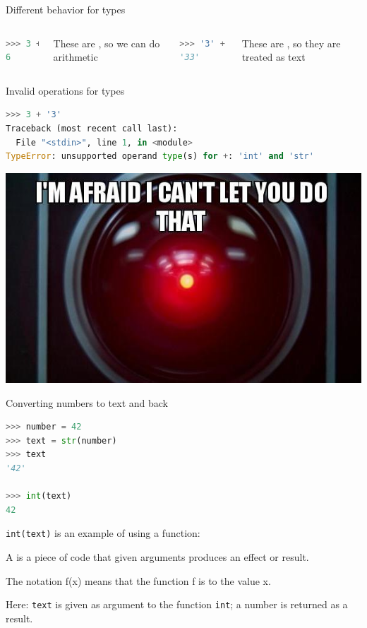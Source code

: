 \documentclass[aspectratio=169,usenames,dvipsnames]{beamer}
\begin{document}
\begin{frame}[fragile]{Different behavior for types}
    \begin{columns}
\begin{lstlisting}[language=python]
>>> 3 + 3
6
\end{lstlisting}

These are , so we can do arithmetic
\begin{lstlisting}[language=python]
>>> '3' + '3'
'33'
\end{lstlisting}

These are , so they are treated as text
    \end{columns}
\end{frame}

\begin{frame}[fragile]{Invalid operations for types}
\begin{lstlisting}[language=python]
>>> 3 + '3'
Traceback (most recent call last):
  File "<stdin>", line 1, in <module>
TypeError: unsupported operand type(s) for +: 'int' and 'str'
\end{lstlisting}
    
    \centering
    \includegraphics[height=0.5\textheight]{fig/cantdothat}
\end{frame}
    

\begin{frame}[fragile]{Converting numbers to text and back}
\begin{lstlisting}[language=python]
>>> number = 42
>>> text = str(number)
>>> text
'42'

>>> int(text)
42
\end{lstlisting}

    \texttt{int(text)} is an example of using a function:

    \begin{definition}
        A  is a piece of code that given arguments
        produces an effect or result.

        The notation f(x) means that the function f is 
        to the value x.
    \end{definition}

    \pause
    Here: \texttt{text} is given as argument to the function \texttt{int};
    a number is returned as a result.
\end{frame}
\end{document}
